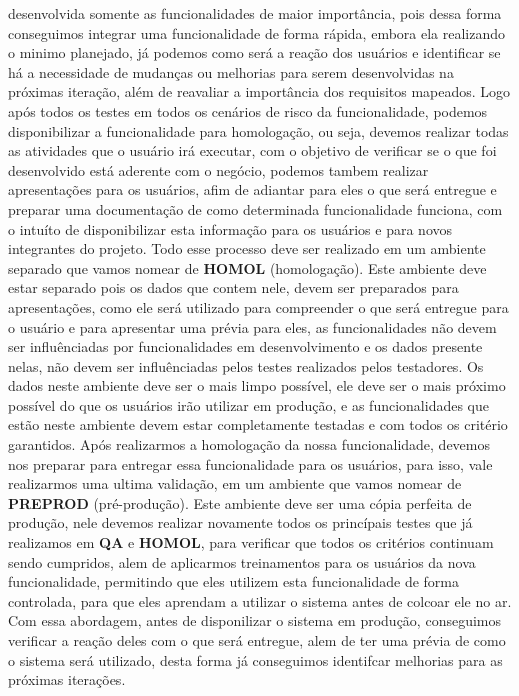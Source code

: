       desenvolvida somente as funcionalidades de maior importância, pois dessa
      forma conseguimos integrar uma funcionalidade de forma rápida, embora ela
      realizando o minimo planejado, já podemos como será a reação dos usuários e
      identificar se há a necessidade de mudanças ou melhorias para serem desenvolvidas
      na próximas iteração, além de reavaliar a importância dos requisitos mapeados. \newline
      Logo após todos os testes em todos os cenários de risco da funcionalidade,
      podemos disponibilizar a funcionalidade para homologação, ou seja, devemos
      realizar todas as atividades que o usuário irá executar, com o objetivo de
      verificar se o que foi desenvolvido está aderente com o negócio, podemos
      tambem realizar apresentações para os usuários, afim de adiantar para eles
      o que será entregue e preparar uma documentação de como determinada funcionalidade
      funciona, com o intuíto de disponibilizar esta informação para os usuários e
      para novos integrantes do projeto. Todo esse processo deve ser realizado em
      um ambiente separado que vamos nomear de \textbf{HOMOL} (homologação). Este ambiente deve
      estar separado pois os dados que contem nele, devem ser preparados para
      apresentações, como ele será utilizado para compreender o que será entregue
      para o usuário e para apresentar uma prévia para eles, as funcionalidades
      não devem ser influênciadas por funcionalidades em desenvolvimento e os
      dados presente nelas, não devem ser influênciadas pelos testes realizados
      pelos testadores. Os dados neste ambiente deve ser o mais limpo possível,
      ele deve ser o mais próximo possível do que os usuários irão utilizar em
      produção, e as funcionalidades que estão neste ambiente devem estar completamente
      testadas e com todos os critério garantidos. \newline
      Após realizarmos a homologação da nossa funcionalidade, devemos nos preparar
      para entregar essa funcionalidade para os usuários, para isso, vale realizarmos
      uma ultima validação, em um ambiente que vamos nomear de \textbf{PREPROD}
      (pré-produção). Este ambiente deve ser uma cópia perfeita de produção, nele
      devemos realizar novamente todos os princípais testes que já realizamos em
      \textbf{QA} e \textbf{HOMOL}, para verificar que todos os critérios continuam
      sendo cumpridos, alem de aplicarmos treinamentos para os usuários da nova
      funcionalidade, permitindo que eles utilizem esta funcionalidade de forma
      controlada, para que eles aprendam a utilizar o sistema antes de colcoar ele
      no ar. Com essa abordagem, antes de disponilizar o sistema em produção,
      conseguimos verificar a reação deles com o que será entregue, alem de ter uma
      prévia de como o sistema será utilizado, desta forma já conseguimos identifcar
      melhorias para as próximas iterações. \newline

